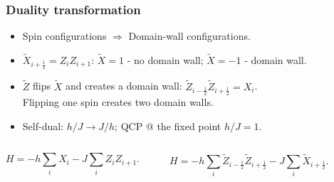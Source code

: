 \documentclass[xcolor=table, 10pt, aspectratio=169]{beamer}
\begin{document}
\begin{frame}
  \frametitle{Duality transformation}
  \begin{itemize}
    \item Spin configurations $\Rightarrow$ Domain-wall configurations.
    \item $\tilde X_{i+\frac12}=Z_iZ_{i+1}$: $\tilde X=1$ - no domain wall; $\tilde X=-1$ - domain wall.
    \item $\tilde Z$ flips $\tilde X$ and  creates a domain wall:
    $\tilde Z_{i-\frac12}\tilde Z_{i+\frac12} = X_i$.\\
    Flipping one spin creates two domain walls.
    \item Self-dual: $h/J\rightarrow J/h$; QCP @ the fixed point $h/J=1$.
  \end{itemize}
  \vspace{2em}
  \begin{columns}
    \[H=-h\sum_i X_i-J\sum_i Z_iZ_{i+1}.\]
    \begin{center}
    \end{center}
    \[H=-h\sum_i \tilde Z_{i-\frac12}\tilde Z_{i+\frac12}-J\sum_i\tilde X_{i+\frac12}.\]
    \begin{center}
    \end{center}
  \end{columns}
\end{frame}
\end{document}
